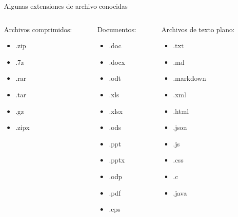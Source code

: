 \begin{frame}{Algunas extensiones de archivo conocidas}
  \begin{columns}
    \begin{column}{0.33\textwidth}
      Archivos comprimidos:
      \begin{itemize}
        \item .zip
        \item .7z
        \item .rar
        \item .tar
        \item .gz
        \item .zipx
      \end{itemize}
    \end{column}
    \begin{column}{0.33\textwidth}
      Documentos:
      \begin{itemize}
        \item .doc
        \item .docx
        \item .odt
        \item .xls
        \item .xlsx
        \item .ods
        \item .ppt
        \item .pptx
        \item .odp
        \item .pdf
        \item .eps
      \end{itemize}
    \end{column}
    \begin{column}{0.33\textwidth}
      Archivos de texto plano:
      \begin{itemize}
        \item .txt
        \item .md
        \item .markdown
        \item .xml
        \item .html
        \item .json
        \item .js
        \item .css
        \item .c
        \item .java
      \end{itemize}
    \end{column}
  \end{columns}
\end{frame}

